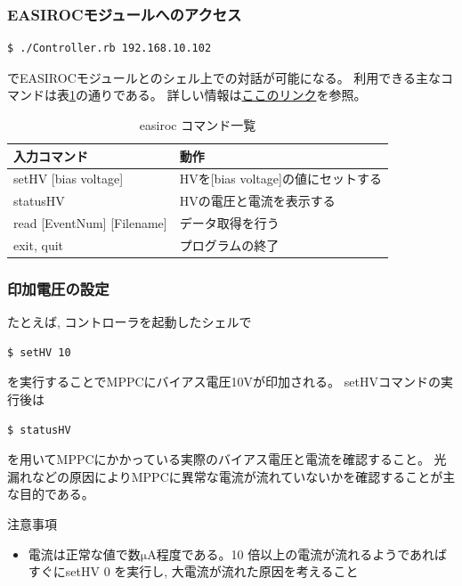 \subsubsection{EASIROCモジュールへのアクセス}
\begin{lstlisting}
$ ./Controller.rb 192.168.10.102
\end{lstlisting}
でEASIROCモジュールとのシェル上での対話が可能になる。
利用できる主なコマンドは表\ref{table:easiroc_controller_commands}の通りである。
詳しい情報は\href{https://ppwww.phys.sci.kobe-u.ac.jp/~hamada/easiroc_manual.html}{ここのリンク}を参照。

\begin{table}[htbp]
  \begin{center}
    \caption{easiroc コマンド一覧}
    \label{table:easiroc_controller_commands}
    \begin{tabular}{|l|l|} \hline
      入力コマンド & 動作                                                     \\ \hline \hline
      setHV [bias voltage] & HVを[bias voltage]の値にセットする\\ \hline
      statusHV & HVの電圧と電流を表示する\\ \hline
      read [EventNum] [Filename] & データ取得を行う \\ \hline
      exit, quit & プログラムの終了\\ \hline
    \end{tabular}
  \end{center}
\end{table}

\subsubsection{印加電圧の設定}

たとえば, コントローラを起動したシェルで
\begin{lstlisting}
$ setHV 10
\end{lstlisting}
を実行することでMPPCにバイアス電圧10Vが印加される。
setHVコマンドの実行後は
\begin{lstlisting}
$ statusHV
\end{lstlisting}
を用いてMPPCにかかっている実際のバイアス電圧と電流を確認すること。
光漏れなどの原因によりMPPCに異常な電流が流れていないかを確認することが主な目的である。

\begin{itembox}[l]{注意事項}
  \begin{itemize}
    \item 電流は正常な値で数$\mathrm{\mu A}$程度である。10 倍以上の電流が流れるようであればすぐにsetHV 0 を実行し, 大電流が流れた原因を考えること
  \end{itemize}
\end{itembox}

